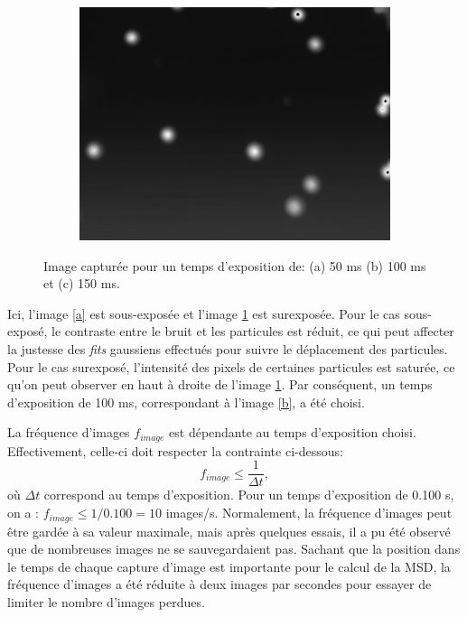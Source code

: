 \documentclass[11pt,letterpaper]{article}
\begin{document}
\begin{figure}[H]
\begin{subfigure}{0.3\textwidth}
    \includegraphics[width=\textwidth]{essai_10um_1im_150ms.png}
    \caption{}
    \label{c}
  \end{subfigure}
  \caption{Image capturée pour un temps d'exposition de: (a) 50 ms (b) 100 ms et (c) 150 ms.}
      \label{exposition}
\end{figure}
Ici, l'image \ref{a} est sous-exposée et l'image \ref{c} est surexposée. Pour le cas sous-exposé, le contraste entre
le bruit et les particules est réduit, ce qui peut affecter la justesse des \textit{fits} gaussiens effectués pour suivre
le déplacement des particules. Pour le cas surexposé, l'intensité des pixels de certaines particules est saturée, ce qu'on peut
observer en haut à droite de l'image \ref{c}. Par conséquent, un temps d'exposition de 100 ms, correspondant à l'image \ref{b}, a été choisi.

La fréquence d'images $f_{image}$ est dépendante au temps d'exposition choisi. Effectivement, celle-ci doit respecter la contrainte
ci-dessous:
\begin{equation*}
  f_{image}\leq \frac{1}{\Delta t},
\end{equation*}
où $\Delta t$ correspond au temps d'exposition. Pour un temps d'exposition de 0.100 s, on a : $f_{image}\leq 1/0.100 = 10$ images/s. 
Normalement, la fréquence d'images peut être gardée à sa valeur maximale, mais après quelques essais, il a pu été observé que de nombreuses
images ne se sauvegardaient pas. Sachant que la position dans le temps de chaque capture d'image est importante pour le calcul de la MSD, la fréquence 
d'images a été réduite à deux images par secondes pour essayer de limiter le nombre d'images perdues. 
\end{document}
